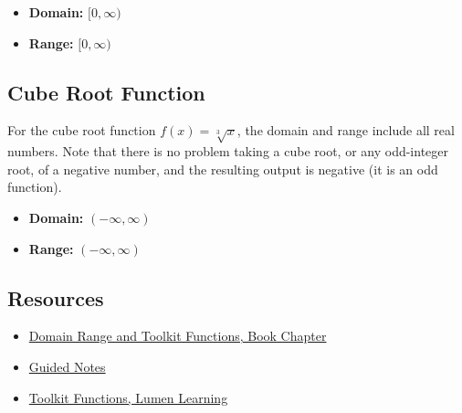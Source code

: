 
\begin{itemize}
    \item \textbf{Domain:} $[0 ,\infty)$
    \item \textbf{Range:} $[0 ,\infty)$
\end{itemize}

\subsection{Cube Root Function}
\label{sss:cube-28dd}

For the cube root function $f(x) = \sqrt[3]{x}$, the domain and range include all real numbers. Note that there is no problem taking a cube root, or any odd-integer root, of a negative number, and the resulting output is negative (it is an odd function).


\begin{itemize}
    \item \textbf{Domain:} $(-\infty ,\infty)$
    \item \textbf{Range:} $(-\infty ,\infty)$
\end{itemize}

\subsection{Resources}
\label{sss:reso-55b5}

\begin{itemize}
    \item \href{https://mathresearch.utsa.edu/wikiFiles/MAT1053/Domain_Range_and_Toolkit_Functions/MAT1053_M1.2Domain_Range_and_Toolkit_Functions.pdf}{Domain Range and Toolkit Functions, Book Chapter}
    \item \href{https://mathresearch.utsa.edu/wikiFiles/MAT1053/Domain_Range_and_Toolkit_Functions/MAT1053_M1.2Domain_Range_and_Toolkit_FunctionsGN.pdf}{Guided Notes}
    \item \href{https://courses.lumenlearning.com/cuny-hunter-collegealgebra/chapter/toolkit-functions/}{Toolkit Functions, Lumen Learning}
\end{itemize}

